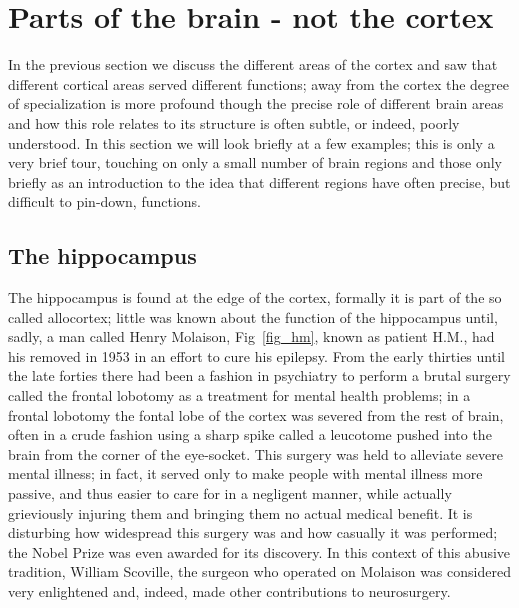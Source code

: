 \documentclass[12pt]{article}
\begin{document}
\section*{Parts of the brain - not the cortex}

In the previous section we discuss the different areas of the cortex
and saw that different cortical areas served different functions; away
from the cortex the degree of specialization is more profound though
the precise role of different brain areas and how this role relates to
its structure is often subtle, or indeed, poorly understood. In this
section we will look briefly at a few examples; this is only a very
brief tour, touching on only a small number of brain regions and those
only briefly as an introduction to the idea that different regions
have often precise, but difficult to pin-down, functions.

\subsection*{The hippocampus}

The hippocampus is found at the edge of the cortex, formally it is
part of the so called allocortex; little was known about the function
of the hippocampus until, sadly, a man called Henry Molaison,
Fig~\ref{fig_hm}, known as patient H.M., had his removed in 1953 in an
effort to cure his epilepsy. From the early thirties until the late
forties there had been a fashion in psychiatry to perform a brutal
surgery called the frontal lobotomy as a treatment for mental health
problems; in a frontal lobotomy the fontal lobe of the cortex was
severed from the rest of brain, often in a crude fashion using a sharp
spike called a leucotome pushed into the brain from the corner of the
eye-socket. This surgery was held to alleviate severe mental illness;
in fact, it served only to make people with mental illness more
passive, and thus easier to care for in a negligent manner, while
actually grieviously injuring them and bringing them no actual medical
benefit. It is disturbing how widespread this surgery was and how
casually it was performed; the Nobel Prize was even awarded for its
discovery. In this context of this abusive tradition, William
Scoville, the surgeon who operated on Molaison was considered very
enlightened and, indeed, made other contributions to neurosurgery.
\end{document}
